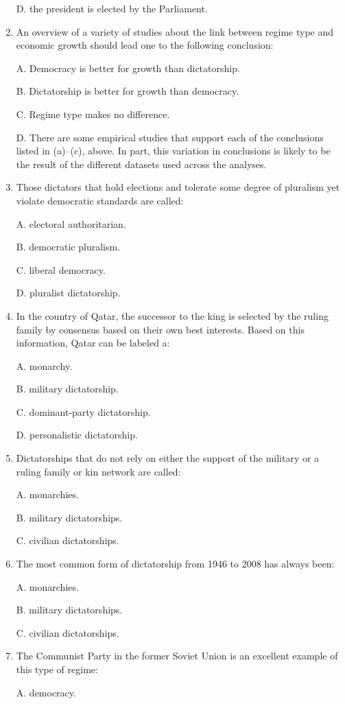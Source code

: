 \documentclass[
]{book}
\begin{document}
\begin{enumerate}
  D. the president is elected by the Parliament.
\item
  An overview of a variety of studies about the link between regime type and economic growth should lead one to the following conclusion:

  A. Democracy is better for growth than dictatorship.

  B. Dictatorship is better for growth than democracy.

  C. Regime type makes no difference.

  D. There are some empirical studies that support each of the conclusions listed in (a)--(c), above. In part, this variation in conclusions is likely to be the result of the different datasets used across the analyses.
\item
  Those dictators that hold elections and tolerate some degree of pluralism yet violate democratic standards are called:

  A. electoral authoritarian.

  B. democratic pluralism.

  C. liberal democracy.

  D. pluralist dictatorship.
\item
  In the country of Qatar, the successor to the king is selected by the ruling family by consensus based on their own best interests. Based on this information, Qatar can be labeled a:

  A. monarchy.

  B. military dictatorship.

  C. dominant-party dictatorship.

  D. personalistic dictatorship.
\item
  Dictatorships that do not rely on either the support of the military or a ruling family or kin network are called:

  A. monarchies.

  B. military dictatorships.

  C. civilian dictatorships.
\item
  The most common form of dictatorship from 1946 to 2008 has always been:

  A. monarchies.

  B. military dictatorships.

  C. civilian dictatorships.
\item
  The Communist Party in the former Soviet Union is an excellent example of this type of regime:

  A. democracy.


\end{enumerate}
\end{document}
